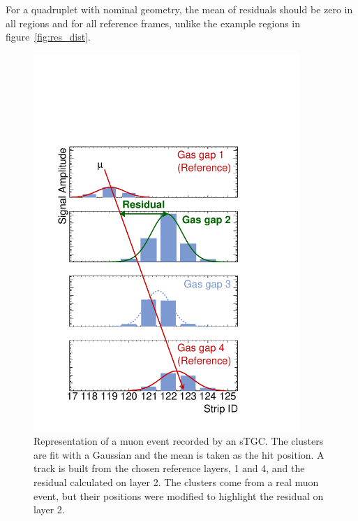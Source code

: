 For a quadruplet with nominal geometry, the mean of residuals should be zero in all regions and for all reference frames, unlike the example regions in figure~\ref{fig:res_dist}.
\begin{figure}
    \centering
    \includegraphics[width = 0.9\textwidth]{figures/figure_fake_event_display.pdf}
    \caption{Representation of a muon event recorded by an sTGC. The clusters are fit with a Gaussian and the mean is taken as the hit position. A track is built from the chosen reference layers, 1 and 4, and the residual calculated on layer 2. The clusters come from a real muon event, but their positions were modified to highlight the residual on layer 2.}
    \label{fig:fake_event_display}
\end{figure}

